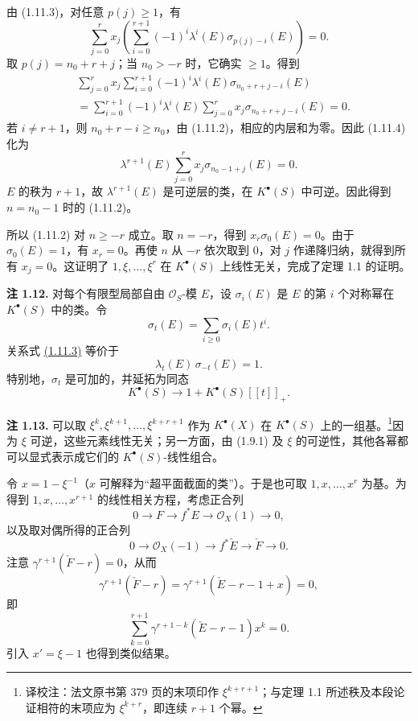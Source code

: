 由 (1.11.3)，对任意 \(p(j)\geq1\)，有
\[
 \sum_{j=0}^r x_j\left(\sum_{i=0}^{r+1}
 (-1)^i\lambda^i(E)\sigma_{p(j)-i}(E)\right)=0.
\]
取 \(p(j)=n_0+r+j\)；当 \(n_0>-r\) 时，它确实 \(\geq1\)。得到
\begin{equation}\tag{1.11.4}
\begin{aligned}
 &\sum_{j=0}^r x_j\sum_{i=0}^{r+1}(-1)^i\lambda^i(E)
                  \sigma_{n_0+r+j-i}(E)\\
 &=\sum_{i=0}^{r+1}(-1)^i\lambda^i(E)
                  \sum_{j=0}^r x_j\sigma_{n_0+r+j-i}(E)=0.
\end{aligned}
\end{equation}
若 \(i\ne r+1\)，则 \(n_0+r-i\geq n_0\)，由 (1.11.2)，相应的内层和为零。因此 (1.11.4) 化为
\[
 \lambda^{r+1}(E)\sum_{j=0}^r x_j\sigma_{n_0-1+j}(E)=0.
\]
\(E\) 的秩为 \(r+1\)，故 \(\lambda^{r+1}(E)\) 是可逆层的类，在 \(K^\bullet(S)\) 中可逆。因此得到 \(n=n_0-1\) 时的 (1.11.2)。

所以 (1.11.2) 对 \(n\geq-r\) 成立。取 \(n=-r\)，得到 \(x_r\sigma_0(E)=0\)。由于 \(\sigma_0(E)=1\)，有 \(x_r=0\)。再使 \(n\) 从 \(-r\) 依次取到 \(0\)，对 \(j\) 作递降归纳，就得到所有 \(x_j=0\)。这证明了 \(1,\xi,\ldots,\xi^r\) 在 \(K^\bullet(S)\) 上线性无关，完成了定理 1.1 的证明。

\textbf{注 1.12.} 对每个有限型局部自由 \(\mathcal O_S\)-模 \(E\)，设 \(\sigma_i(E)\) 是 \(E\) 的第 \(i\) 个对称幂在 \(K^\bullet(S)\) 中的类。令
\[
  \sigma_t(E)=\sum_{i\geq 0}\sigma_i(E)t^i .
\]
关系式 \hyperlink{sga6.e06.eq.1-11-3}{(1.11.3)} 等价于
\[
  \lambda_t(E)\,\sigma_{-t}(E)=1.\tag{1.12.1}
\]
特别地，\(\sigma_t\) 是可加的，并延拓为同态
\[
  K^\bullet(S)\longrightarrow 1+K^\bullet(S)[[t]]_+ .
\]

\textbf{注 1.13.} 可以取 \(\xi^k,\xi^{k+1},\ldots,\xi^{k+r+1}\) 作为 \(K^\bullet(X)\) 在 \(K^\bullet(S)\) 上的一组基。\footnote{译校注：法文原书第 379 页的末项印作 \(\xi^{k+r+1}\)；与定理 1.1 所述秩及本段论证相符的末项应为 \(\xi^{k+r}\)，即连续 \(r+1\) 个幂。}因为 \(\xi\) 可逆，这些元素线性无关；另一方面，由 (1.9.1) 及 \(\xi\) 的可逆性，其他各幂都可以显式表示成它们的 \(K^\bullet(S)\)-线性组合。

令 \(x=1-\xi^{-1}\)（\(x\) 可解释为“超平面截面的类”）。于是也可取 \(1,x,\ldots,x^r\) 为基。为得到 \(1,x,\ldots,x^{r+1}\) 的线性相关方程，考虑正合列
\[
 0\longrightarrow F\longrightarrow f^*E\longrightarrow\mathcal O_X(1)\longrightarrow0,
\]
以及取对偶所得的正合列
\[
 0\longrightarrow\mathcal O_X(-1)\longrightarrow f^*\check E
 \longrightarrow\check F\longrightarrow0.
\]
注意 \(\gamma^{r+1}(\check F-r)=0\)，从而
\[
 \gamma^{r+1}(\check F-r)
 =\gamma^{r+1}(\check E-r-1+x)=0,
\]
即
\begin{equation}\tag{1.13.1}
 \sum_{k=0}^{r+1}\gamma^{r+1-k}(\check E-r-1)x^k=0.
\end{equation}
引入 \(x'=\xi-1\) 也得到类似结果。

